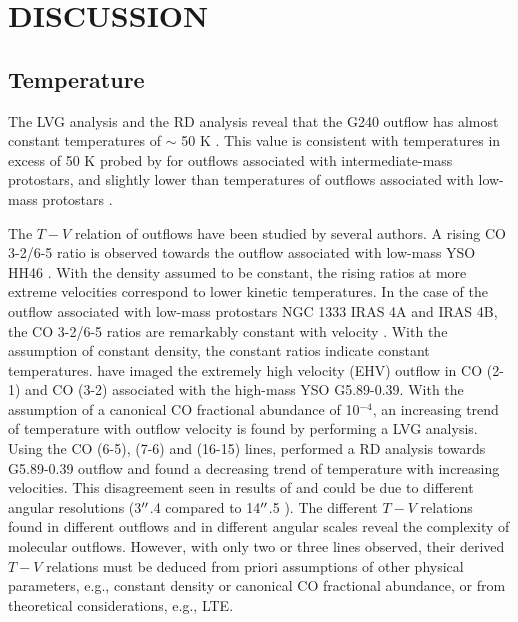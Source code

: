 \section{DISCUSSION}\label{discussion}

\subsection{Temperature}
The LVG analysis and the RD analysis reveal that the G240 outflow has almost constant temperatures of $\sim$ 50 K . This value is consistent with temperatures in excess of 50 K probed by \citet{2016A&A...587A..17V} for outflows associated with intermediate-mass protostars, and slightly lower than temperatures of outflows associated with low-mass protostars \citep{2009A&A...501..633V, 2012A&A...542A..86Y}.

The $T-V$ relation of outflows have been studied by several authors.  A rising CO 3-2/6-5 ratio is observed towards the outflow associated with low-mass YSO HH46 \citep{2009A&A...501..633V}. With the density assumed to be constant, the rising ratios at more extreme velocities correspond to lower kinetic temperatures. In the case of the outflow associated with low-mass protostars NGC 1333 IRAS 4A and  IRAS 4B, the CO 3-2/6-5 ratios are remarkably constant with velocity \citep{2012A&A...542A..86Y}. With the assumption of constant density, the constant ratios indicate constant temperatures. \citet{2012ApJ...744L..26S} have imaged the extremely high velocity (EHV) outflow in CO (2-1) and CO (3-2) associated with the high-mass YSO G5.89-0.39. With the assumption of a canonical CO fractional abundance of 10$^{-4}$, an increasing trend of temperature with outflow velocity is found by performing a LVG analysis. Using the CO (6-5), (7-6) and (16-15) lines, \citet{2015A&A...584A..70L} performed a RD analysis towards G5.89-0.39 outflow and found a decreasing trend of temperature with increasing velocities. This disagreement seen in results of \citet{2012ApJ...744L..26S} and \citet{2015A&A...584A..70L} could be due to different angular resolutions (3${\mbox{$^{\prime\prime}$}}$.4 compared to 14${\mbox{$^{\prime\prime}$}}$.5 ). The different $T-V$ relations found in different outflows and in different angular scales reveal the complexity of molecular outflows. However, with only two or three lines observed, their derived $T-V$ relations must be deduced from priori assumptions of other physical parameters, e.g., constant density or canonical CO fractional abundance, or from theoretical considerations, e.g., LTE.

